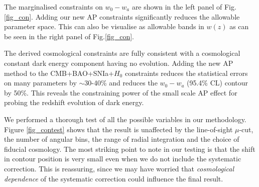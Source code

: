 \documentclass[prl,twocolumn,superscriptaddress,aps,amsmath,amssymb,nofootinbib,altaffilletter]{revtex4}
\begin{document}
The marginalised constraints on $w_0-w_a$ are shown in the left panel of Fig.\ref{fig_con}.
Adding our new AP constraints significantly reduces the allowable parameter space. 
This can also be visualise as allowable bands in $w(z)$ as can be seen in the right panel of Fig.\ref{fig_con}.  

The derived cosmological constraints are fully consistent with a cosmological constant dark energy component having no evolution.
Adding the new AP method to the CMB+BAO+SNIa+$H_0$ constraints reduces the statistical errors on many parameters by $\sim$30-40\% 
and reduces the $w_0-w_a$ (95.4\% CL) contour by 50\%.
This reveals the constraining power of the small scale AP effect for probing the redshift evolution of dark energy.

We performed a thorough test of all the possible variables in our methodology.
Figure \ref{fig_contest} shows that 
the result is unaffected by the line-of-sight $\mu$-cut, 
the number of angular bins, 
the range of radial integration and the choice of fiducial cosmology. 
The most striking point to note in our testing is that the 
shift in contour position is very small even when we do not include the systematic correction.
This is reassuring, since we may have worried that {\it cosmological dependence} 
of the systematic correction could influence the final result. 
\end{document}
